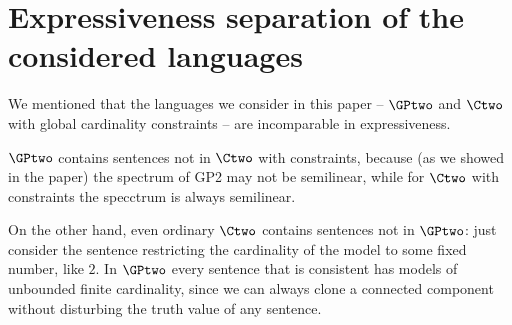 





\section*{Expressiveness separation of the considered languages}
We mentioned that the languages we consider in this paper -- $\GPtwo$ and $\Ctwo$ with global cardinality constraints -- are incomparable in expressiveness.

$\GPtwo$  contains sentences not in $\Ctwo$ with constraints, because (as we showed in the paper) the spectrum of GP2 may not be semilinear, while for $\Ctwo$ with constraints the specctrum is always semilinear.

On the other hand, even ordinary $\Ctwo$ contains sentences not in $\GPtwo$: just consider the sentence restricting the cardinality of the model to some fixed number, like $2$. In $\GPtwo$ every sentence that is consistent has models of unbounded finite cardinality, since we can always clone a connected component without disturbing the truth value of any sentence.

